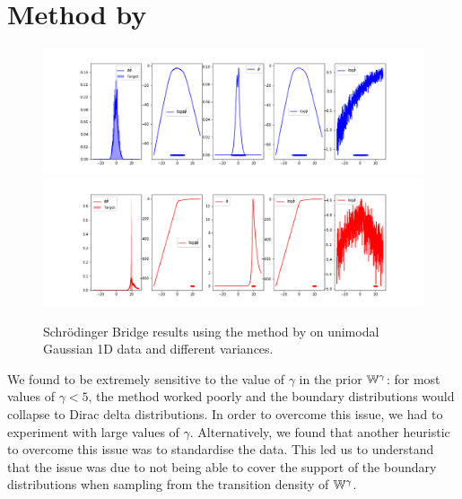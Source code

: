 \documentclass[a4paper,12pt,twoside,openright]{report}
\theoremstyle{definition}
\begin{document}
\section{Method by \cite{pavon2018data}}
\begin{figure}[t]
    \centering
    \includegraphics[scale=0.4,trim={2.3cm 0.2cm 1.5cm 0}, clip]{images/Pavon/Forward_bigvar_test_working.png}\\\vspace{-0.2cm}
    \includegraphics[scale=0.4,trim={2.3cm 0 1.5cm 1.5cm}, clip]{images/Pavon/Backward_bigvar_test_working.png} 
    \caption{Schrödinger Bridge results using the method by \cite{pavon2018data} on unimodal Gaussian 1D data and different variances. }
    \label{fig:small_to_big}
\end{figure}
We found \cite{pavon2018data} to be extremely sensitive to the value of $\gamma$ in the prior $\mathbb{W}^{\gamma}$: for most values of $\gamma < 5$, the method worked poorly and the boundary distributions would collapse to Dirac delta distributions. In order to overcome this issue, we had to experiment with large values of $\gamma$. Alternatively, we found that another heuristic to overcome this issue was to standardise the data.  This led us to understand that the issue was due to not being able to cover the support of the boundary distributions when sampling from the transition density of $\mathbb{W}^{\gamma}$. 
\end{document}
